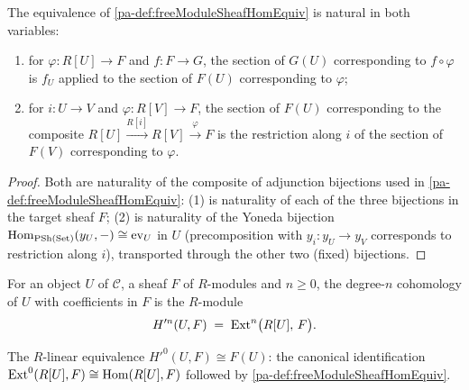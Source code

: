 \begin{lemma}
  \label{pa-lem:freeModuleSheafHomEquiv_naturality}
  \leanok

  The equivalence of \ref{pa-def:freeModuleSheafHomEquiv} is natural in both variables:
  \begin{enumerate}
    \item for \(\varphi : R[U] \to F\) and \(f : F \to G\), the section of \(G(U)\)
      corresponding to \(f \circ \varphi\) is \(f_U\) applied to the section of \(F(U)\)
      corresponding to \(\varphi\);
    \item for \(i : U \to V\) and \(\varphi : R[V] \to F\), the section of \(F(U)\)
      corresponding to the composite \(R[U] \xrightarrow{R[i]} R[V] \xrightarrow{\varphi} F\)
      is the restriction along \(i\) of the section of \(F(V)\) corresponding to \(\varphi\).
  \end{enumerate}
\end{lemma}
\begin{proof}
  \leanok
  Both are naturality of the composite of adjunction bijections used in
  \ref{pa-def:freeModuleSheafHomEquiv}: (1) is naturality of each of the three bijections in
  the target sheaf \(F\); (2) is naturality of the Yoneda bijection
  \(\operatorname{Hom}_{\mathrm{PSh}(\mathrm{Set})}(y_U,-) \cong \mathrm{ev}_U\) in \(U\) (precomposition
  with \(y_i : y_U \to y_V\) corresponds to restriction along \(i\)), transported through the
  other two (fixed) bijections.
\end{proof}

\begin{definition}
  \label{pa-def:HModule'}
  \leanok

  For an object \(U\) of \(\mathcal C\), a sheaf \(F\) of \(R\)-modules and \(n \ge 0\), the
  degree-\(n\) cohomology of \(U\) with coefficients in \(F\) is the \(R\)-module
  \[
    H'^n(U, F) \;=\; \operatorname{Ext}^n\bigl(R[U],\, F\bigr).
  \]
\end{definition}

\begin{definition}
  \label{pa-def:HModule'_linearEquiv0}
  \leanok

  The \(R\)-linear equivalence \(H'^0(U, F) \cong F(U)\): the canonical identification
  \(\operatorname{Ext}^0(R[U], F) \cong \operatorname{Hom}(R[U], F)\) followed by \ref{pa-def:freeModuleSheafHomEquiv}.
\end{definition}

